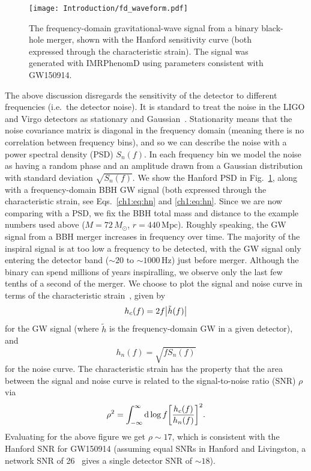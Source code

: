 \begin{figure}[t]
    \centering
    \texttt{[image: Introduction/fd\_waveform.pdf]}
    \caption[The frequency-domain gravitational-wave signal from a binary black-hole merger]{ 
    The frequency-domain gravitational-wave signal from a binary black-hole merger, shown with the Hanford sensitivity curve (both expressed through the characteristic strain). 
    The signal was generated with IMRPhenomD using parameters consistent with GW150914.
    }
    \label{ch1:fig:fd_waveform}
\end{figure}

The above discussion disregards the sensitivity of the detector to different frequencies (i.e.\ the detector noise).
It is standard to treat the noise in the LIGO and Virgo detectors as stationary and Gaussian~\cite{LIGOScientific:2019hgc}.
Stationarity means that the noise covariance matrix is diagonal in the frequency domain (meaning there is no correlation between frequency bins), and so we can describe the noise with a power spectral density (PSD) $S_n(f)$.
In each frequency bin we model the noise as having a random phase and an amplitude drawn from a Gaussian distribution with standard deviation $\sqrt{S_n(f)}$.
We show the Hanford PSD in Fig.~\ref{ch1:fig:fd_waveform}, along with a frequency-domain BBH GW signal (both expressed through the characteristic strain, see Eqs.~\ref{ch1:eq:hn} and \ref{ch1:eq:hn}.
Since we are now comparing with a PSD, we fix the BBH total mass and distance to the example numbers used above ($M = 72\,M_\odot$, $r = 440\,\mathrm{Mpc}$).
Roughly speaking, the GW signal from a BBH merger increases in frequency over time.
The majority of the inspiral signal is at too low a frequency to be detected, with the GW signal only entering the detector band ($\sim 20$ to $\sim 1000\,\mathrm{Hz}$) just before merger.
Although the binary can spend millions of years inspiralling, we observe only the last few tenths of a second of the merger.
We choose to plot the signal and noise curve in terms of the characteristic strain~\cite{Moore:2014lga}, given by
\begin{equation}\label{ch1:eq:hc}
    h_c(f) = 2f\abs{\tilde{h}(f)}
\end{equation}
for the GW signal (where $\tilde{h}$ is the frequency-domain GW in a given detector), and
\begin{equation}\label{ch1:eq:hn}
    h_n(f) = \sqrt{fS_n(f)}
\end{equation}
for the noise curve.
The characteristic strain has the property that the area between the signal and noise curve is related to the signal-to-noise ratio (SNR) $\rho$ via
\begin{equation}
    \rho^2 = \int_{-\infty}^\infty \dd\log{f} \qty[\frac{h_c(f)}{h_n(f)}]^2.
\end{equation}
Evaluating for the above figure we get $\rho \sim 17$, which is consistent with the Hanford SNR for GW150914 (assuming equal SNRs in Hanford and Livingston, a network SNR of 26~\cite{LIGOScientific:2021usb} gives a single detector SNR of $\sim 18$).


